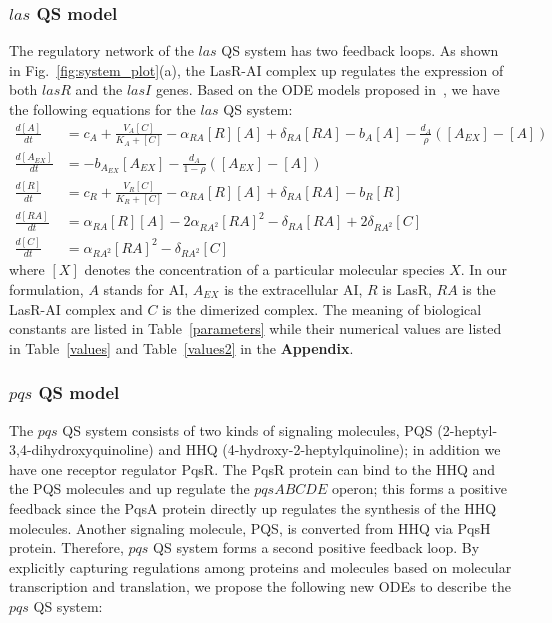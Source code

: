 \documentclass[runningheads]{llncs}
\begin{document}
\subsubsection{$las$ QS model}
The regulatory network of the $las$ QS system has two feedback loops. As shown in Fig.~\ref{fig:system_plot}(a), the LasR-AI complex up regulates the expression of both $lasR$ and the $lasI$ genes.  Based on the ODE models proposed in~\cite{Melke2010}\cite{Williams2008}, we have the following equations for the $las$ QS system:
\begingroup\makeatletter\def\f@size{9}\check@mathfonts
\def\maketag@@@#1{\hbox{\m@th\small\normalfont#1}}%
\begin{align}
\label{AIluxI}
\frac{d[A]}{dt} &= c_{A}+\frac{V_{A}[C]}{K_{A}+[C]} - \alpha_{RA}[R][A]+ \delta_{RA}[RA] -b_{A}[A] -\frac{d_{A}}{\rho} ([A_{EX}] - [A])\\
\label{A1ex}
\frac{d[A_{EX}]}{dt} &=  -b_{A_{EX}}[A_{EX}] -\frac{d_{A}}{1-\rho} ([A_{EX}] - [A])  \\
\label{luxReq}
\frac{d[R]}{dt} &= c_{R}+\frac{V_{R}[C]}{K_{R}+[C]} - \alpha_{RA}[R][A]+ \delta_{RA}[RA] - b_{R}[R]\\
\label{RAformationeq}
\frac{d[RA]}{dt} &= \alpha_{RA}[R][A]  -2\alpha_{RA^2}[RA]^{2} - \delta_{RA}[RA]  + 2\delta_{RA^2}[C]\\
\label{Cformationeq}
\frac{d[C]}{dt} &= \alpha_{RA^2}[RA]^{2} - \delta_{RA^2}[C]
\end{align}\endgroup
where $[X]$ denotes the concentration of a particular molecular species $X$. In our formulation, $A$ stands for AI, $A_{EX}$ is the extracellular AI, $R$ is LasR, $RA$ is the LasR-AI complex and $C$ is the dimerized complex.  The meaning of biological constants are listed in Table~\ref{parameters} while their numerical values are listed in Table~\ref{values} and Table~\ref{values2} in the \textbf{Appendix}. 

\vspace{-10pt}


\subsubsection{$pqs$ QS model}
The $pqs$ QS system consists of two kinds of signaling molecules, PQS (2-heptyl-3,4-dihydroxyquinoline) and HHQ (4-hydroxy-2-heptylquinoline); in addition we have one receptor regulator PqsR. The PqsR protein can bind to the HHQ and the PQS molecules and up regulate the $pqsABCDE$ operon; this forms a positive feedback since the PqsA protein directly up regulates the synthesis of the HHQ molecules. Another signaling molecule, PQS, is converted from HHQ via PqsH protein. Therefore, $pqs$ QS system forms a second positive feedback loop. By explicitly capturing regulations among proteins and molecules based on molecular transcription and translation, we propose the following new ODEs to describe the $pqs$ QS system:
\end{document}
